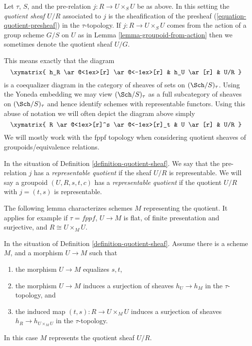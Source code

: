 \begin{definition}
\label{definition-quotient-sheaf}
Let $\tau$, $S$, and the pre-relation $j : R \to U \times_S U$ be as above.
In this setting the {\it quotient sheaf $U/R$} associated
to $j$ is the sheafification of the presheaf
(\ref{equation-quotient-presheaf}) in the $\tau$-topology.
If $j : R \to U \times_S U$ comes from the action of a group scheme
$G/S$ on $U$ as in Lemma \ref{lemma-groupoid-from-action} then we
sometimes denote the quotient sheaf $U/G$.
\end{definition}

\noindent
This means exactly that the diagram
$$
\xymatrix{
h_R \ar@<1ex>[r] \ar@<-1ex>[r] &
h_U \ar[r] &
U/R
}
$$
is a coequalizer diagram in the category of sheaves of sets
on $(\Sch/S)_\tau$. Using the Yoneda embedding we
may view $(\Sch/S)_\tau$ as a full subcategory of
sheaves on $(\Sch/S)_\tau$ and hence identify schemes
with representable functors. Using this abuse of notation
we will often depict the diagram above simply
$$
\xymatrix{
R \ar@<1ex>[r]^s \ar@<-1ex>[r]_t &
U \ar[r] &
U/R
}
$$
We will mostly work with the fppf topology when considering
quotient sheaves of groupoids/equivalence relations.

\begin{definition}
\label{definition-representable-quotient}
In the situation of Definition \ref{definition-quotient-sheaf}.
We say that the pre-relation $j$ has a
{\it representable quotient} if the sheaf $U/R$ is representable.
We will say a groupoid $(U, R, s, t, c)$ has a
{\it representable quotient}
if the quotient $U/R$ with $j = (t, s)$ is representable.
\end{definition}

\noindent
The following lemma characterizes schemes $M$ representing the quotient.
It applies for example if $\tau = fppf$, $U \to M$ is flat,
of finite presentation and surjective, and $R \cong U \times_M U$.

\begin{lemma}
\label{lemma-criterion-quotient-representable}
In the situation of Definition \ref{definition-quotient-sheaf}.
Assume there is a scheme $M$, and a morphism $U \to M$ such that
\begin{enumerate}
\item the morphism $U \to M$ equalizes $s, t$,
\item the morphism $U \to M$ induces a surjection of sheaves
$h_U \to h_M$ in the $\tau$-topology, and
\item the induced map $(t, s) : R \to U \times_M U$ induces a
surjection of sheaves $h_R \to h_{U \times_M U}$ in the $\tau$-topology.
\end{enumerate}
In this case $M$ represents the quotient sheaf $U/R$.
\end{lemma}

